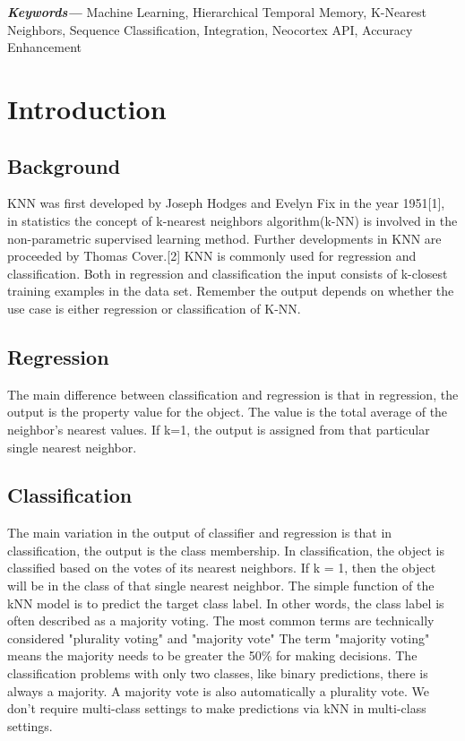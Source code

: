 \documentclass[conference]{IEEEtran}
\providecommand{\keywords}[1]
{
  \small	
  \textbf{\textit{Keywords---}} #1
}
\begin{document}
\keywords{Machine Learning, Hierarchical Temporal Memory, K-Nearest Neighbors, Sequence Classification, Integration, Neocortex API, Accuracy Enhancement}





\IEEEpeerreviewmaketitle



\section{Introduction}

\subsection{Background}
KNN was first developed by Joseph Hodges and Evelyn Fix in the year 1951[1], in statistics the concept of k-nearest neighbors algorithm(k-NN) is involved in the non-parametric supervised learning method. Further developments in KNN are proceeded by Thomas Cover.[2]  KNN is commonly used for regression and classification. Both in regression and classification the input consists of k-closest training examples in the data set. Remember the output depends on whether the use case is either regression or classification of K-NN. 

\subsection{Regression}
The main difference between classification and regression is that in regression, the output is the property value for the object. The value is the total average of the neighbor's nearest values. If k=1, the output is assigned from that particular single nearest neighbor. 

\subsection{Classification}
The main variation in the output of classifier and regression is that in classification, the output is the class membership. In classification, the object is classified based on the votes of its nearest neighbors. If k = 1, then the object will be in the class of that single nearest neighbor. The simple function of the kNN model is to predict the target class label. In other words, the class label is often described as a majority voting. The most common terms are technically considered "plurality voting" and "majority vote" The term "majority voting" means the majority needs to be greater the 50\%  
for making decisions. The classification problems with only two classes, like binary predictions, there is always a majority. A majority vote is also automatically a plurality vote. We don't require multi-class settings to make predictions via kNN in multi-class settings. 
\end{document}
